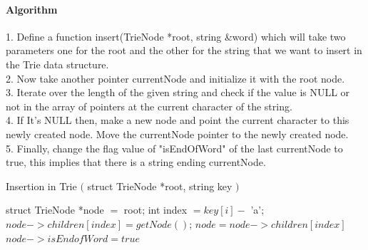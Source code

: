 \documentclass[11pt,a4paper]{article}
\begin{document}
\paragraph{Algorithm}
1. Define a function insert(TrieNode *root, string &word) which will take two parameters one for the root and the other for the string that we want to insert in the Trie data structure.
\\
2. Now take another pointer currentNode and initialize it with the root node.
\\
3. Iterate over the length of the given string and check if the value is NULL or not in the array of pointers at the current character of the string.
\\
4. If It’s NULL then, make a new node and point the current character to this newly created node. Move the currentNode pointer to the newly created node.
\\
5. Finally, change the flag value of "isEndOfWord" of the last currentNode to true, this implies that there is a string ending currentNode.
\\
\begin{algorithm}[H]
\caption*{Insertion in Trie \begin{math} ( \end{math} struct TrieNode *root, string key \begin{math} ) \end{math} }
\label{InsertionTriepsuedocode}
\begin{algorithmic}
\STATE struct TrieNode *node \begin{math} = \end{math} root;
\STATE int index \begin{math}= key[i] - \end{math} 'a';
\STATE \hspace{0.5cm} \begin{math} node->children[index] = getNode() \end{math};
\ENDIF
\STATE \begin{math} node = node->children[index] \end{math}
\ENDFOR
\\
\begin{math} node->isEndofWord = true \end{math}
\end{algorithmic}
\end{algorithm}
\end{document}
